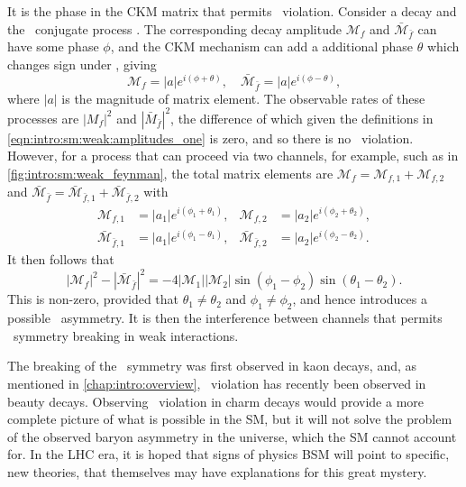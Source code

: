 It is the phase in the \ac{CKM} matrix that permits \CP\ violation.
Consider a decay  and the \CP\ conjugate process
.
The corresponding decay amplitude $\mathcal{M}_{f}$ and $\bar{\mathcal{M}}_{\bar{f}}$ can have some phase $\phi$, and the \ac{CKM} mechanism can add a additional phase $\theta$ which changes sign under \CP, giving
\begin{equation}
  \mathcal{M}_{f}             = |a| e^{i(\phi + \theta)}, \quad
  \bar{\mathcal{M}}_{\bar{f}} = |a| e^{i(\phi - \theta)},
  \label{eqn:intro:sm:weak:amplitudes_one}
\end{equation}
where $|a|$ is the magnitude of matrix element.
The observable rates of these processes are $|M_{f}|^{2}$ and $|\bar{M}_{\bar{f}}|^{2}$, the difference of which given the definitions in \cref{eqn:intro:sm:weak:amplitudes_one} is zero, and so there is no \CP\ violation.
However, for a process that can proceed via two channels, for example, such as in 
\cref{fig:intro:sm:weak_feynman}, the total matrix elements are $\mathcal{M}_{f} = 
\mathcal{M}_{f,1} + \mathcal{M}_{f,2}$ and $\bar{\mathcal{M}}_{\bar{f}} = 
\bar{\mathcal{M}}_{\bar{f},1} + \bar{\mathcal{M}}_{\bar{f},2}$ with
\begin{align*}
  \mathcal{M}_{f,1} &= |a_{1}| e^{i(\phi_{1} + \theta_{1})}, &
  \mathcal{M}_{f,2} &= |a_{2}| e^{i(\phi_{2} + \theta_{2})},\\
  \bar{\mathcal{M}}_{\bar{f},1} &= |a_{1}| e^{i(\phi_{1} - \theta_{1})}, &
  \bar{\mathcal{M}}_{\bar{f},2} &= |a_{2}| e^{i(\phi_{2} - \theta_{2})}.
\end{align*}
It then follows that
\begin{equation*}
  |\mathcal{M}_{f}|^{2} - |\bar{\mathcal{M}}_{\bar{f}}|^{2} =
  -4|\mathcal{M}_{1}||\mathcal{M}_{2}|\sin(\phi_{1} - \phi_{2})\sin(\theta_{1} - \theta_{2}).
\end{equation*}
This is non-zero, provided that $\theta_{1} \neq \theta_{2}$ and $\phi_{1} \neq 
\phi_{2}$, and hence introduces a possible \CP\ asymmetry.
It is then the interference between channels that permits \CP\ symmetry 
breaking in weak interactions.

The breaking of the \CP\ symmetry was first observed in kaon decays, and, as mentioned in \cref{chap:intro:overview}, \CP\ violation has recently been observed in beauty decays.
Observing \CP\ violation in charm decays would provide a more complete picture of what is possible in the \ac{SM}, but it will not solve the problem of the observed baryon asymmetry in the universe, which the \ac{SM} cannot account for.
In the \ac{LHC} era, it is hoped that signs of physics \acl{BSM} will point to specific, new theories, that themselves may have explanations for this great mystery.

